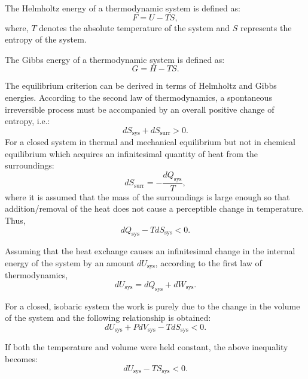 		The Helmholtz energy of a thermodynamic system is defined as:
		\begin{equation}
			F = U - TS,
		\end{equation}
		where, $T$ denotes the absolute temperature of the system and $S$ represents the entropy of the system.

		The Gibbs energy of a thermodynamic system is defined as:
		\begin{equation}
			G = H - TS.
		\end{equation}

		The equilibrium criterion can be derived in terms of Helmholtz and Gibbs energies. According to the second law of thermodynamics, a spontaneous irreversible process must be accompanied by an overall positive change of entropy, i.e.:
		\begin{equation}
			dS_\text{sys} + dS_\text{surr} > 0.
		\end{equation}
		For a closed system in thermal and mechanical equilibrium but not in chemical equilibrium which acquires an infinitesimal quantity of heat from the surroundings:
		\begin{equation}
			dS_\text{surr} = -\frac{dQ_\text{sys}}{T},
		\end{equation}
		where it is assumed that the mass of the surroundings is large enough so that addition/removal of the heat does not cause a perceptible change in temperature. Thus,
		\begin{equation}
			{dQ_\text{sys}} - T dS_\text{sys}  < 0.
		\end{equation}

		Assuming that the heat exchange causes an infinitesimal change in the internal energy of the system by an amount $dU_\text{sys}$, according to the first law of thermodynamics,
		\begin{equation}
			{dU_\text{sys}} = {dQ_\text{sys}} + {dW_\text{sys}}.
		\end{equation}

		For a closed, isobaric system the work is purely due to the change in the volume of the system and the following relationship is obtained:
		\begin{equation}
			{dU_\text{sys}} + P{dV_\text{sys}} - T{dS_\text{sys}} < 0.
		\end{equation}

		If both the temperature and volume were held constant, the above inequality becomes:
		\begin{equation}
			d{U_\text{sys} - TS_\text{sys} } < 0.
		\end{equation}

